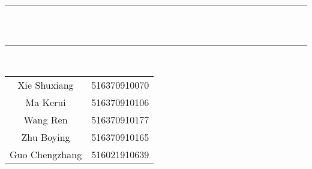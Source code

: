 \documentclass{article}
\begin{document}
\vspace*{3em}
\begin{center}
{\rule{11cm}{0.01cm} \\ \tiny~
\\ \large {}
\rule{11cm}{0.01cm}  
\vspace*{3.5em}
\\  \large{}}
\end{center}

\normalsize
\vspace*{10em}
\begin{center}
\begin{tabular}{cl}
\large
\vspace{0.3em} Xie Shuxiang&516370910070\vspace{0.3em}\\ 
\large
Ma Kerui\vspace{0.3em} &516370910106 \vspace{0.3em}\\ 
\large
Wang Ren\vspace{0.3em} &516370910177 \vspace{0.3em}\\ 
\large
Zhu Boying\vspace{0.3em} &516370910165 \vspace{0.3em}\\ 
\large
Guo Chengzhang\vspace{0.3em} &516021910639 \vspace{0.3em}\\ 
 
\end{tabular}
\end{center}
\end{document}
